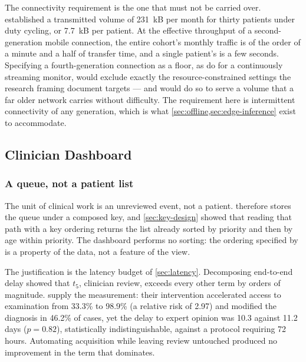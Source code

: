 \documentclass[12pt,a4paper,oneside]{report}
\begin{document}
The connectivity requirement is the one that must not be carried over.  established a transmitted volume of 231~kB per month for thirty patients under duty cycling, or 7.7~kB per patient. At the effective throughput of a second-generation mobile connection, the entire cohort's monthly traffic is of the order of a minute and a half of transfer time, and a single patient's is a few seconds. Specifying a fourth-generation connection as a floor, as \textcite{efendi2025} do for a continuously streaming monitor, would exclude exactly the resource-constrained settings the research framing document targets --- and would do so to serve a volume that a far older network carries without difficulty. The requirement here is intermittent connectivity of any generation, which is what \cref{sec:offline,sec:edge-inference} exist to accommodate.

\subsection{Clinician Dashboard}\label{sec:dashboard}

\subsubsection{A queue, not a patient list}\label{sec:queue-view}

The unit of clinical work is an unreviewed event, not a patient.  therefore stores the queue under a composed key, and \cref{sec:key-design} showed that reading that path with a key ordering returns the list already sorted by priority and then by age within priority. The dashboard performs no sorting: the ordering specified by \textcite{yazdani2018} is a property of the data, not a feature of the view.

The justification is the latency budget of \cref{sec:latency}. Decomposing end-to-end delay showed that $t_5$, clinician review, exceeds every other term by orders of magnitude. \Textcite{bediang2021} supply the measurement: their intervention accelerated access to examination from 33.3\% to 98.9\% (a relative risk of 2.97) and modified the diagnosis in 46.2\% of cases, yet the delay to expert opinion was 10.3 against 11.2 days ($p = 0.82$), statistically indistinguishable, against a protocol requiring 72 hours. Automating acquisition while leaving review untouched produced no improvement in the term that dominates.
\end{document}
